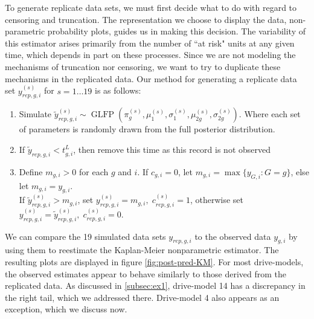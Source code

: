 \documentclass[12pt]{article}
\newcommand{\op}{\operatorname}
\begin{document}
To generate replicate data sets, we must first decide what to do with regard to censoring and truncation. The representation we choose to display the data, non-parametric probability plots, guides us in making this decision. The variability of this estimator arises primarily from the number of ``at risk" units at any given time, which depends in part on these processes. Since we are not modeling the mechanisms of truncation nor censoring, we want to try to duplicate these mechanisms in the replicated data. Our method for generating a replicate data set  $y_{rep,g,i}^{(s)}$ for $s = 1 \dots 19$ is as follows:
\begin{enumerate}
\item Simulate $\tilde{y}_{rep,g,i}^{(s)} \sim \op{GLFP}(\pi_{g}^{(s)},\mu_1^{(s)},\sigma_1^{(s)},\mu_{2g}^{(s)}, \sigma_{2g}^{(s)})$.  Where each set of parameters is randomly drawn from the full posterior distribution.
\item If $\tilde{y}_{rep,g,i} < t_{g,i}^L$, then remove this time as this record is not observed
\item Define $m_{g,i}>0$ for each $g$ and $i$. If $c_{g,i}=0$, let $m_{g,i}=\max \{y_{G,i}: G=g\}$, else let $m_{g,i}=y_{g,i}$.\\
If $\tilde{y}_{rep,g,i}^{(s)}>m_{g,i}$, set $y_{rep,g,i}^{(s)}=m_{g,i},\; c_{rep,g,i}^{(s)}=1$, otherwise set $y_{rep,g,i}^{(s)}=\tilde{y}_{rep,g,i}^{(s)},\; c_{rep,g,i}^{(s)}=0$.
\end{enumerate}

We can compare the 19 simulated data sets $y_{rep,g, i}$ to the observed data $y_{g,i}$ by using them to reestimate the Kaplan-Meier nonparametric estimator. The resulting plots are displayed in figure \ref{fig:post-pred-KM}. For most drive-models, the observed estimates appear to behave similarly to those derived from the replicated data. As discussed in \ref{subsec:ex1}, drive-model 14 has a discrepancy in the right tail, which we addressed there. Drive-model 4 also appears as an exception, which we discuss now.
\end{document}
